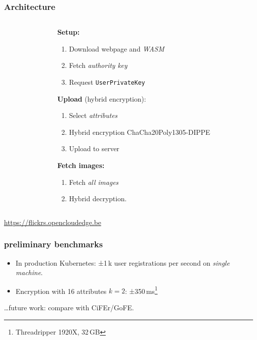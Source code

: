 \documentclass[aspectratio=169]{beamer}
\begin{document}
\begin{frame}
  \frametitle{Architecture}
  \begin{columns}
    \begin{column}{.55\textwidth}
    \end{column}
    \begin{column}{.45\textwidth}
      \textbf{Setup:}
      \begin{enumerate}
        \item Download webpage and \emph{WASM}
        \item Fetch \emph{authority key}
        \item Request \texttt{UserPrivateKey}
      \end{enumerate}

      \smallskip

      \textbf{Upload} (hybrid encryption):
      \begin{enumerate}
        \item Select \emph{attributes}
        \item Hybrid encryption ChaCha20Poly1305-DIPPE
        \item Upload to server
      \end{enumerate}

      \smallskip

      \textbf{Fetch images:}
      \begin{enumerate}
        \item Fetch \emph{all images}
        \item Hybrid decryption.
      \end{enumerate}
    \end{column}
  \end{columns}

  \medskip

  {\small \url{https://flickrs.opencloudedge.be}}
\end{frame}

\begin{frame}
  \frametitle{preliminary benchmarks}

  \begin{itemize}
    \item In production Kubernetes: ±1\,k user registrations per second on \emph{single machine}.
    \item Encryption with 16 attributes \(k=2\): ±350\,ms\footnote{Threadripper 1920X, 32\,GB}
  \end{itemize}

  \dots future work: compare with CiFEr/GoFE.
\end{frame}
\end{document}
